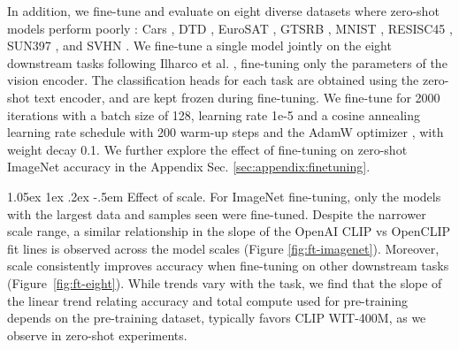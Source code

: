 \documentclass[11pt,table]{article}
\makeatletter
\newcommand{\citep}{\cite}
\renewcommand\paragraph{\@startsection{paragraph}{4}{\z@}                                     {1.05ex \@plus1ex \@minus.2ex}                                {-.5em}
{\normalfont\normalsize\bfseries}}
\makeatother
\begin{document}

In addition, we fine-tune and evaluate on eight diverse datasets where zero-shot models perform poorly \cite{radford2021learning,ilharco2022patching}: Cars \citep{cars}, DTD \citep{dtd}, EuroSAT \citep{eurosat}, GTSRB \citep{gtsrb}, MNIST \citep{lecun1998mnist}, RESISC45 \citep{cheng2017remote}, SUN397 \citep{sun397}, and SVHN \citep{svhn}. We fine-tune a single model jointly on the eight downstream tasks following Ilharco et al. \cite{ilharco2022patching}, fine-tuning only the parameters of the vision encoder. The classification heads for each task are obtained using the zero-shot text encoder, and are kept frozen during fine-tuning.
We fine-tune for 2000 iterations with a batch size of 128, learning rate 1e-5 and a cosine annealing learning rate schedule with 200 warm-up steps and the AdamW optimizer \citep{loshchilov2018decoupled}, with weight decay 0.1.
We further explore the effect of fine-tuning on zero-shot ImageNet accuracy in the Appendix Sec. \ref{sec:appendix:finetuning}. 

\paragraph{Effect of scale.} For ImageNet fine-tuning, only the models with the largest data and samples seen were fine-tuned. Despite the narrower scale range, a similar relationship in the slope of the OpenAI CLIP vs OpenCLIP fit lines is observed across the model scales (Figure \ref{fig:ft-imagenet}). Moreover, scale consistently improves accuracy when fine-tuning on other downstream tasks (Figure~\ref{fig:ft-eight}).
While trends vary with the task, we find that the slope of the linear trend relating accuracy and total compute used for pre-training depends on the pre-training dataset, typically favors CLIP WIT-400M, as we observe in zero-shot experiments.


\end{document}
